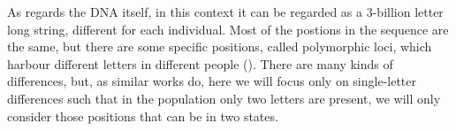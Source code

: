 As regards the DNA itself, in this context it can be regarded as a 
3-billion letter long string, different for each individual. Most of the 
postions in the sequence are the same, but there are some specific 
positions, called polymorphic loci, which harbour different letters in 
different people (). There are many kinds of 
differences, but, as similar works do, 
 here we will focus only on 
single-letter differences such that in the population only two letters 
are present, \ie we will only consider those positions that can be in 
two states.

\begin{marginfigure}[2cm]
\setlength{\tabcolsep}{2pt}


\end{marginfigure}
